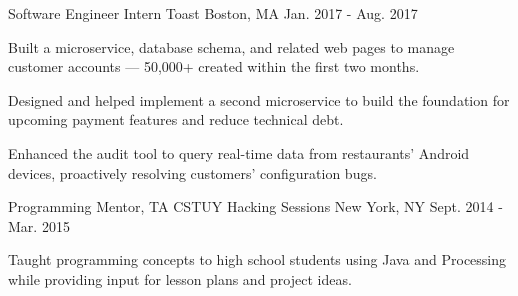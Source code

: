 \begin{cventries}
  \cventry
  {Software Engineer Intern} %
  {Toast} %
  {Boston, MA} %
  {Jan. 2017 - Aug. 2017} %
  {
    \begin{cvitems} %
      \item {Built a microservice, database schema, and related web pages to manage customer accounts --- 50,000+ created within the first two months.}
      \item {Designed and helped implement a second microservice to build the foundation for upcoming payment features and reduce technical debt.}
      \item {Enhanced the audit tool to query real-time data from restaurants' Android devices, proactively resolving customers' configuration bugs.}
    \end{cvitems}
  }

  \cventry
  {Programming Mentor, TA} %
  {CSTUY Hacking Sessions} %
  {New York, NY} %
  {Sept. 2014 - Mar. 2015} %
  {
    \begin{cvitems} %
      \item {Taught programming concepts to high school students using Java and Processing while providing input for lesson plans and project ideas.}
    \end{cvitems}
  }
\end{cventries}
